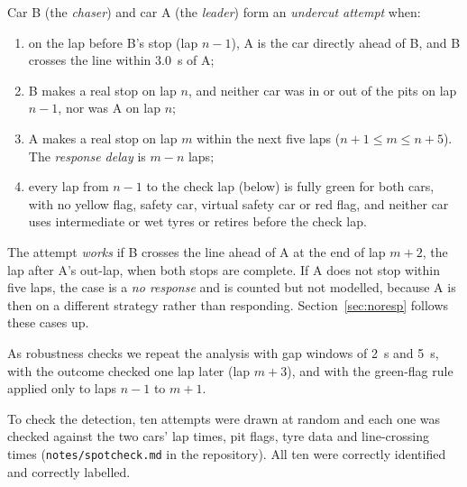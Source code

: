 \documentclass[12pt]{article}
\begin{document}
Car B (the \emph{chaser}) and car A (the \emph{leader}) form an \emph{undercut attempt} when:
\begin{enumerate}
\item on the lap before B's stop (lap $n-1$), A is the car directly ahead of B, and B crosses the line within 3.0~s of A;
\item B makes a real stop on lap $n$, and neither car was in or out of the pits on lap $n-1$, nor was A on lap $n$;
\item A makes a real stop on lap $m$ within the next five laps ($n+1 \le m \le n+5$). The \emph{response delay} is $m-n$ laps;
\item every lap from $n-1$ to the check lap (below) is fully green for both cars, with no yellow flag, safety car, virtual safety car or red flag, and neither car uses intermediate or wet tyres or retires before the check lap.
\end{enumerate}
The attempt \emph{works} if B crosses the line ahead of A at the end of lap $m+2$, the lap after A's out-lap, when both stops are complete. If A does not stop within five laps, the case is a \emph{no response} and is counted but not modelled, because A is then on a different strategy rather than responding. Section~\ref{sec:noresp} follows these cases up.

As robustness checks we repeat the analysis with gap windows of 2~s and 5~s, with the outcome checked one lap later (lap $m+3$), and with the green-flag rule applied only to laps $n-1$ to $m+1$.

To check the detection, ten attempts were drawn at random and each one was checked against the two cars' lap times, pit flags, tyre data and line-crossing times (\texttt{notes/spotcheck.md} in the repository). All ten were correctly identified and correctly labelled.
\end{document}

